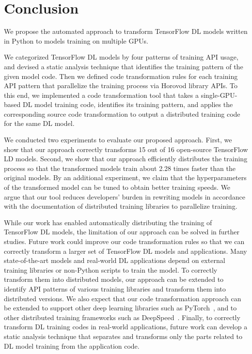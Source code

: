 \section{Conclusion}\label{sec:conclusion}
We propose the automated approach to transform TensorFlow DL models written in
Python to models training on multiple GPUs.
\begin{inred}
We categorized TensorFlow DL models by four patterns of training API usage,
and devised a static analysis technique that identifies the training pattern
of the given model code.
Then we defined code transformation rules for each training API pattern
that parallelize the training process via Horovod library APIs.
To this end, we implemented a code transformation tool
that takes a single-GPU-based DL model training code,
identifies its training pattern, and applies the corresponding source code
transformation to output a distributed training code for the same DL model.

We conducted two experiments to evaluate our proposed approach.
First, we show that our approach correctly transforms 15 out of 16
open-source TensorFlow LD models.
Second, we show that our approach efficiently distributes the training process
so that the transformed models train about 2.28 times faster than the original models.
By an additional experiment,
we claim that the hyperparameters of the transformed model can be tuned to
obtain better training speeds.
We argue that our tool reduces developers' burden in rewriting models
in accordance with the documentation of distributed training libraries to
parallelize training.

While our work has enabled automatically distributing the training of TensorFlow
DL models, the limitation of our approach can be solved in further studies.
Future work could improve our code transformation rules so that 
we can correctly transform a larger set of TensorFlow DL models and applications.
Many state-of-the-art models and real-world DL applications
depend on external training libraries or non-Python scripts to train the model.
To correctly transform them into distributed models,
our approach can be extended to identify API patterns of various training libraries
and transform them into distributed versions.
We also expect that our code transformation approach can be extended to
support other deep learning libraries such as PyTorch~\cite{pytorch2019},
and to other distributed training frameworks such as DeepSpeed~\cite{deepspeed}.
Finally, to correctly transform DL training codes in real-world applications,
future work can develop a static analysis technique that separates 
and transforms only the parts related to DL model training from the application code. 


\end{inred}
